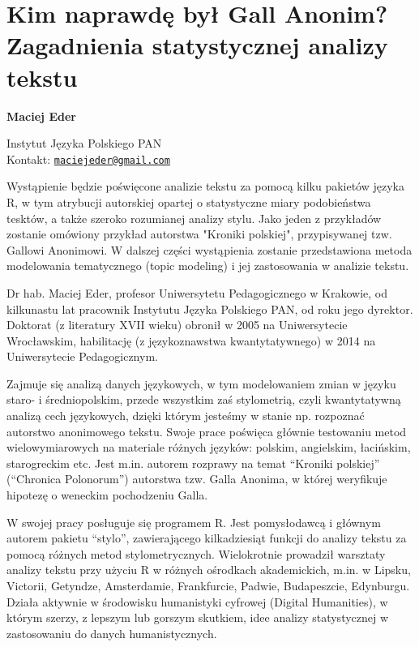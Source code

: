 \documentclass[\main/boa.tex]{subfiles}
\begin{document}
\section{Kim naprawdę był Gall Anonim? Zagadnienia statystycznej analizy tekstu}


\begin{minipage}{0.915\textwidth}
	\centering
  {\bf \LARGE {} Maciej Eder}
\end{minipage}



\begin{affiliations}
\begin{minipage}{0.915\textwidth}
\centering
\large Instytut Języka Polskiego PAN  \\[1pt]
Kontakt: \href{mailto:maciejeder@gmail.com}{\nolinkurl{maciejeder@gmail.com}}\\
\end{minipage}
\end{affiliations}


Wystąpienie będzie poświęcone analizie tekstu za pomocą kilku pakietów języka R, w tym atrybucji autorskiej opartej o statystyczne miary podobieństwa tesktów, a także szeroko rozumianej analizy stylu. Jako jeden z przykładów zostanie omówiony przykład autorstwa "Kroniki polskiej", przypisywanej tzw. Gallowi Anonimowi. W dalszej części wystąpienia zostanie przedstawiona metoda modelowania tematycznego (topic modeling) i jej zastosowania w analizie tekstu. 

\bio
Dr hab. Maciej Eder, profesor Uniwersytetu Pedagogicznego w Krakowie, od kilkunastu lat pracownik Instytutu Języka Polskiego PAN, od roku jego dyrektor. Doktorat (z literatury XVII wieku) obronił w 2005 na Uniwersytecie Wrocławskim, habilitację (z językoznawstwa kwantytatywnego) w 2014 na Uniwersytecie Pedagogicznym.

Zajmuje się analizą danych językowych, w tym modelowaniem zmian w języku staro- i średniopolskim, przede wszystkim zaś stylometrią, czyli kwantytatywną analizą cech językowych, dzięki którym jesteśmy w stanie np. rozpoznać autorstwo anonimowego tekstu. Swoje prace poświęca głównie testowaniu metod wielowymiarowych na materiale różnych języków: polskim, angielskim, łacińskim, starogreckim etc. Jest m.in. autorem rozprawy na temat “Kroniki polskiej” (“Chronica Polonorum”) autorstwa tzw. Galla Anonima, w której weryfikuje hipotezę o weneckim pochodzeniu Galla.

W swojej pracy posługuje się programem R. Jest pomysłodawcą i głównym autorem pakietu “stylo”, zawierającego kilkadziesiąt funkcji do analizy tekstu za pomocą różnych metod stylometrycznych. Wielokrotnie prowadził warsztaty analizy tekstu przy użyciu R w różnych ośrodkach akademickich, m.in. w Lipsku, Victorii, Getyndze, Amsterdamie, Frankfurcie, Padwie, Budapeszcie, Edynburgu. Działa aktywnie w środowisku humanistyki cyfrowej (Digital Humanities), w którym szerzy, z lepszym lub gorszym skutkiem, idee analizy statystycznej w zastosowaniu do danych humanistycznych.
\end{document}
